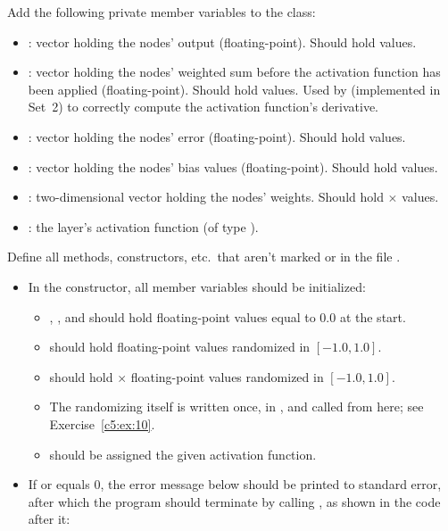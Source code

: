 \label{c5:ex:7}
Add the following private member variables to the class:
\begin{itemize}
  \item {}: vector holding the nodes' output (floating-point). Should hold
     values.
  \item {}: vector holding the nodes' weighted sum before the activation
    function has been applied (floating-point). Should hold  values. Used by
     (implemented in Set~2) to correctly compute the activation function's
    derivative.
  \item {}: vector holding the nodes' error (floating-point). Should hold
     values.
  \item {}: vector holding the nodes' bias values (floating-point). Should hold
     values.
  \item {}: two-dimensional vector holding the nodes' weights. Should hold
     $\times$  values.
  \item {}: the layer's activation function (of type ).
\end{itemize}

\label{c5:ex:8}
Define all methods, constructors, etc.\ that aren't marked  or  in the
file .

\begin{itemize}
  \item In the constructor, all member variables should be initialized:
  \begin{itemize}
    \item {}, , and  should hold
       floating-point values equal to 0.0 at the start.
    \item {} should hold  floating-point values randomized in
      $[-1.0, 1.0]$.
    \item {} should hold  $\times$  floating-point
      values randomized in $[-1.0, 1.0]$.
    \item The randomizing itself is written once, in , and called from here; see
      Exercise~\ref{c5:ex:10}.
    \item {} should be assigned the given activation function.
  \end{itemize}
  \item If  or  equals 0, the error message below should be
    printed to standard error, after which the program should terminate by calling
    , as shown in the code after it:
\end{itemize}

